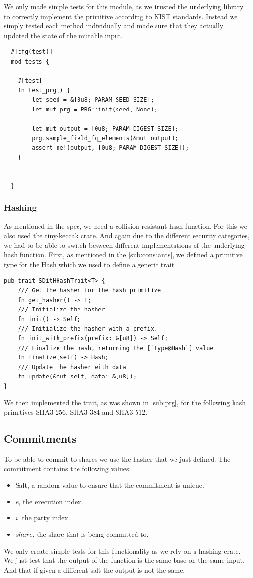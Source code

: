 \documentclass[11pt]{report}
\theoremstyle{definition}
\theoremstyle{plain}
\begin{document}
We only made simple tests for this module, as we trusted the underlying library to correctly implement the primitive according to NIST standards. Instead we simply tested each method individually and made sure that they actually updated the state of the mutable input.

\begin{verbatim}
  #[cfg(test)]
  mod tests {

    #[test]
    fn test_prg() {
        let seed = &[0u8; PARAM_SEED_SIZE];
        let mut prg = PRG::init(seed, None);

        let mut output = [0u8; PARAM_DIGEST_SIZE];
        prg.sample_field_fq_elements(&mut output);
        assert_ne!(output, [0u8; PARAM_DIGEST_SIZE]);
    }

    ...
  }
\end{verbatim}

\subsubsection{Hashing}\label{sec:hashing} %
As mentioned in the spec, we need a collision-resistant hash function. For this we also used the tiny-keccak crate. And again due to the different security categories, we had to be able to switch between different implementations of the underlying hash function.
First, as mentioned in the \autoref{sub:constants}, we defined a primitive type for the Hash which we used to define a generic trait:
\begin{verbatim}
pub trait SDitHHashTrait<T> {
    /// Get the hasher for the hash primitive
    fn get_hasher() -> T;
    /// Initialize the hasher
    fn init() -> Self;
    /// Initialize the hasher with a prefix. 
    fn init_with_prefix(prefix: &[u8]) -> Self;
    /// Finalize the hash, returning the [`type@Hash`] value
    fn finalize(self) -> Hash;
    /// Update the hasher with data
    fn update(&mut self, data: &[u8]);
}
\end{verbatim}
We then implemented the trait, as was shown in \autoref{sub:prg}, for the following hash primitives SHA3-256, SHA3-384 and SHA3-512.

\subsection{Commitments}
To be able to commit to shares we use the hasher that we just defined. The commitment contains the following values:
\begin{itemize}
  \item Salt, a random value to ensure that the commitment is unique.
  \item $e$, the execution index.
  \item $i$, the party index.
  \item $share$, the share that is being committed to.
\end{itemize}
We only create simple tests for this functionality as we rely on a hashing crate. We just test that the output of the function is the same base on the same input. And that if given a different salt the output is not the same.
\end{document}
